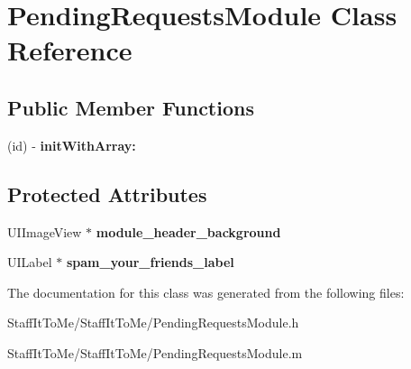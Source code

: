 \hypertarget{interface_pending_requests_module}{
\section{\-Pending\-Requests\-Module \-Class \-Reference}
\label{interface_pending_requests_module}
}
\subsection*{\-Public \-Member \-Functions}
\begin{DoxyCompactItemize}
\item 
\hypertarget{interface_pending_requests_module_a5a44ffdba4dd56c8930d32a0a9fb29b1}{
(id) -\/ {\bfseries init\-With\-Array\-:}}
\label{interface_pending_requests_module_a5a44ffdba4dd56c8930d32a0a9fb29b1}

\end{DoxyCompactItemize}
\subsection*{\-Protected \-Attributes}
\begin{DoxyCompactItemize}
\item 
\hypertarget{interface_pending_requests_module_a4ce768019f758cbdd241203bbeac0c33}{
\-U\-I\-Image\-View $\ast$ {\bfseries module\-\_\-header\-\_\-background}}
\label{interface_pending_requests_module_a4ce768019f758cbdd241203bbeac0c33}

\item 
\hypertarget{interface_pending_requests_module_aaf6bee6e83d2365cbcbcec11dce622f5}{
\-U\-I\-Label $\ast$ {\bfseries spam\-\_\-your\-\_\-friends\-\_\-label}}
\label{interface_pending_requests_module_aaf6bee6e83d2365cbcbcec11dce622f5}

\end{DoxyCompactItemize}


\-The documentation for this class was generated from the following files\-:\begin{DoxyCompactItemize}
\item 
\-Staff\-It\-To\-Me/\-Staff\-It\-To\-Me/\-Pending\-Requests\-Module.\-h\item 
\-Staff\-It\-To\-Me/\-Staff\-It\-To\-Me/\-Pending\-Requests\-Module.\-m\end{DoxyCompactItemize}

